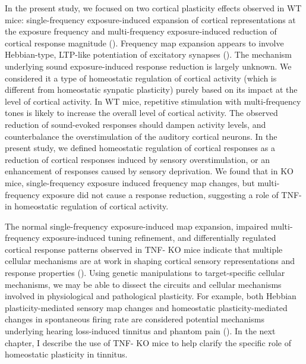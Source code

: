 In the present study, we focused on two cortical plasticity effects observed in WT mice: single-frequency exposure-induced expansion of cortical representations at the exposure frequency and multi-frequency exposure-induced reduction of cortical response magnitude (\cite{Condon1991, Zhang2001, Pienkowski2012}). Frequency map expansion appears to involve Hebbian-type, LTP-like potentiation of excitatory synapses (\cite{Froemke2007, Sun2010}). The mechanism underlying sound exposure-induced response reduction is largely unknown. We considered it a type of homeostatic regulation of cortical activity (which is different from homeostatic synpatic plasticity) purely based on its impact at the level of cortical activity. In WT mice, repetitive stimulation with multi-frequency tones is likely to increase the overall level of cortical activity. The observed reduction of sound-evoked responses should dampen activity levels, and counterbalance the overstimulation of the auditory cortical neurons. In the present study, we defined homeostatic regulation of cortical responses as a reduction of cortical responses induced by sensory overstimulation, or an enhancement of responses caused by sensory deprivation. We found that in KO mice, single-frequency exposure induced frequency map changes, but multi-frequency exposure did not cause a response reduction, suggesting a role of TNF-\textalpha{} in homeostatic regulation of cortical activity.

The normal single-frequency exposure-induced map expansion, impaired multi-frequency exposure-induced tuning refinement, and differentially regulated cortical response patterns observed in TNF-\textalpha{} KO mice indicate that multiple cellular mechanisms are at work in shaping cortical sensory representations and response properties (\cite{Bear2003, Bear2003, Burrone2003, Turrigiano2004, Dan2006, Liu2007, Wu2008, Feldman2009}). Using genetic manipulations to target-specific cellular mechanisms, we may be able to dissect the circuits and cellular mechanisms involved in physiological and pathological plasticity. For example, both Hebbian plasticity-mediated sensory map changes and homeostatic plasticity-mediated changes in spontaneous firing rate are considered potential mechanisms underlying hearing loss-induced tinnitus and phantom pain (\cite{Eggermont2006, Yang2011a}). In the next chapter, I describe the use of TNF-\textalpha{} KO mice to help clarify the specific role of homeostatic plasticity in tinnitus.

\printbibliography